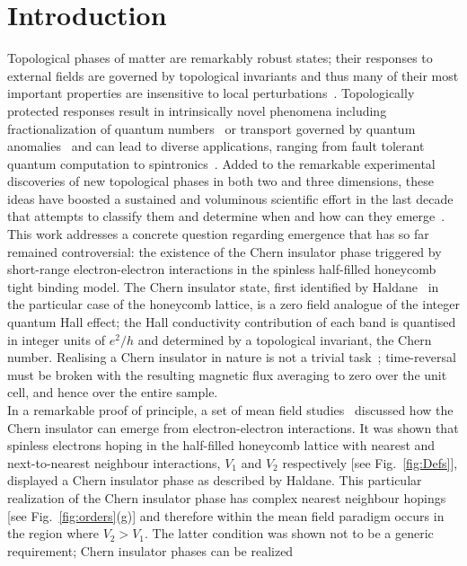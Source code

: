 \documentclass[aps,prx,10pt,twocolumn,floatfix,superscriptaddress,showpacs,numerical,footinbib]{revtex4-1}
\begin{document}
\section{Introduction}
%
Topological phases of matter are remarkably robust states; their responses to external fields are
governed by topological invariants and thus many of their most important properties are insensitive to local perturbations~\cite{HK10,QZ11}.
%
Topologically protected responses result in intrinsically novel phenomena
including fractionalization of quantum numbers~\cite{Nayak2008} or transport governed by quantum anomalies~\cite{V03}
and can lead to diverse applications, ranging from fault tolerant quantum computation to spintronics~\cite{HK10,QZ11,Nayak2008}.
%
Added to the remarkable experimental discoveries of new topological phases in both two and three dimensions,
these ideas have boosted a sustained and voluminous scientific effort in the last decade that attempts to classify them 
and determine when and how can they emerge~\cite{S14}.\\
%
This work addresses a concrete question regarding emergence that has so far remained controversial: 
the existence of the Chern insulator phase triggered by short-range electron-electron interactions in the
spinless half-filled honeycomb tight binding model.
%
The Chern insulator state, first identified by Haldane~\cite{H88} in the particular case of the honeycomb lattice, is a zero field analogue of the
integer quantum Hall effect; the Hall conductivity contribution of each band is quantised in integer units of $e^2/h$ and determined by a topological invariant, the Chern number.
%
Realising a Chern insulator in nature is not a trivial task~\cite{CZF13}; time-reversal must be broken with
the resulting magnetic flux averaging to zero over the unit cell, and hence over the entire sample.\\
%
In a remarkable proof of principle, a set of mean field studies~\cite{RQHZ08,WF10,GCC13} 
discussed how the Chern insulator can emerge from electron-electron interactions. 
%
It was shown that spinless electrons hoping in the half-filled honeycomb lattice with nearest and next-to-nearest neighbour interactions, $V_{1}$ and $V_{2}$ respectively 
[see Fig.~\ref{fig:Defs}], displayed a Chern insulator phase as described by Haldane.
%
This particular realization of the Chern insulator phase has complex nearest neighbour hopings [see Fig.~\ref{fig:orders}(g)]
and therefore within the mean field paradigm occurs in the region where $V_{2}>V_{1}$.
%
The latter condition 
was shown not to be a generic requirement; Chern insulator phases can be realized 
\end{document}

